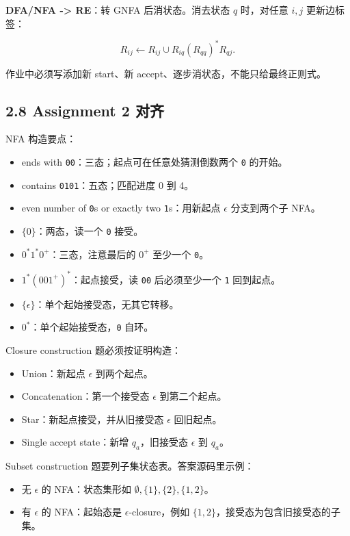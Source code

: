 ﻿\documentclass[UTF8,11pt]{ctexart}
\begin{document}
\textbf{DFA/NFA -> RE}：转 GNFA 后消状态。消去状态 \(q\) 时，对任意 \(i,j\) 更新边标签：

\[
R_{ij}\leftarrow R_{ij}\cup R_{iq}(R_{qq})^*R_{qj}.
\]

作业中必须写添加新 start、新 accept、逐步消状态，不能只给最终正则式。


\subsection{2.8 Assignment 2 对齐}


NFA 构造要点：


\begin{itemize}
\item ends with \texttt{00}：三态；起点可在任意处猜测倒数两个 \texttt{0} 的开始。
\item contains \texttt{0101}：五态；匹配进度 0 到 4。
\item even number of \texttt{0}s or exactly two \texttt{1}s：用新起点 \(\epsilon\) 分支到两个子 NFA。
\item \(\{0\}\)：两态，读一个 \texttt{0} 接受。
\item \(0^*1^*0^+\)：三态，注意最后的 \(0^+\) 至少一个 \texttt{0}。
\item \(1^*(001^+)^*\)：起点接受，读 \texttt{00} 后必须至少一个 \texttt{1} 回到起点。
\item \(\{\epsilon\}\)：单个起始接受态，无其它转移。
\item \(0^*\)：单个起始接受态，\texttt{0} 自环。
\end{itemize}


Closure construction 题必须按证明构造：


\begin{itemize}
\item Union：新起点 \(\epsilon\) 到两个起点。
\item Concatenation：第一个接受态 \(\epsilon\) 到第二个起点。
\item Star：新起点接受，并从旧接受态 \(\epsilon\) 回旧起点。
\item Single accept state：新增 \(q_a\)，旧接受态 \(\epsilon\) 到 \(q_a\)。
\end{itemize}


Subset construction 题要列子集状态表。答案源码里示例：


\begin{itemize}
\item 无 \(\epsilon\) 的 NFA：状态集形如 \(\emptyset,\{1\},\{2\},\{1,2\}\)。
\item 有 \(\epsilon\) 的 NFA：起始态是 \(\epsilon\)-closure，例如 \(\{1,2\}\)，接受态为包含旧接受态的子集。
\end{itemize}
\end{document}
